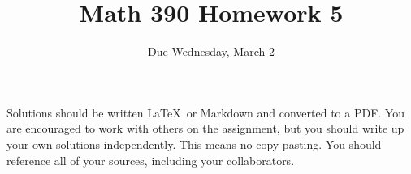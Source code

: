 \documentclass{article}
\title{Math 390 Homework 5}
\author{Due Wednesday, March 2}
\date{}
\begin{document}

\maketitle

\setlength{\parindent}{0em} %
\setlength{\parskip}{1em} %



Solutions should be written \LaTeX\ or Markdown and converted to a PDF. You are encouraged to work with others
on the assignment, but you should write up your own solutions independently. This means no copy pasting. You should
reference all of your sources, including your collaborators. 
\end{document}
